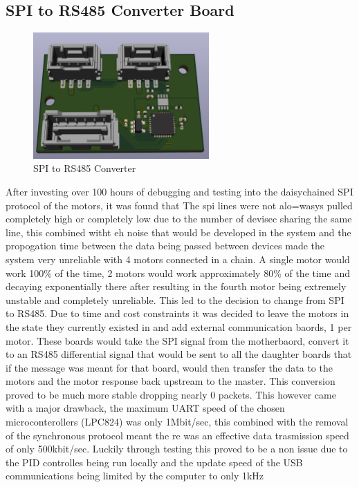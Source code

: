 \subsection{SPI to RS485 Converter Board}
\begin{figure}[H]
       \centering
       \includegraphics[width=0.6\textwidth]{figures/ConverterBoard.png}
       \caption{SPI to RS485 Converter}
       \label{fig:SPItoRS485ConverterPCB}
   \end{figure}
   After investing over 100 hours of debugging and testing into the daisychained SPI protocol of the motors, it was found that The spi lines were not alo=wasys pulled completely high or completely low due to the number of devisec sharing the same line, this combined witht eh noise that would be developed in the system and the propogation time between the data being passed between devices made the system very unreliable with 4 motors connected in a chain. A single motor would work 100\% of the time, 2 motors would work approximately 80\% of the time and decaying exponentially there after resulting in the fourth motor being extremely unstable and completely unreliable. This led to the decision to change from SPI to RS485. Due to time and cost constraints it was decided to leave the motors in the state they currently existed in and add external communication baords, 1 per motor. These boards would take the SPI signal from the motherbaord, convert it to an RS485 differential signal that would be sent to all the daughter boards that if the message was meant for that board, would then transfer the data to the motors and the motor response back upstream to the master. This conversion proved to be much more stable dropping nearly 0 packets. This however came with a major drawback, the maximum UART speed of the chosen microconterollers (LPC824) was only 1Mbit/sec, this combined with the removal of the synchronous protocol meant the re was an effective data trasmission speed of only 500kbit/sec. Luckily through testing this proved to be a non issue due to the PID controlles being run locally and the update speed of the USB communications being limited by the computer to only 1kHz 

